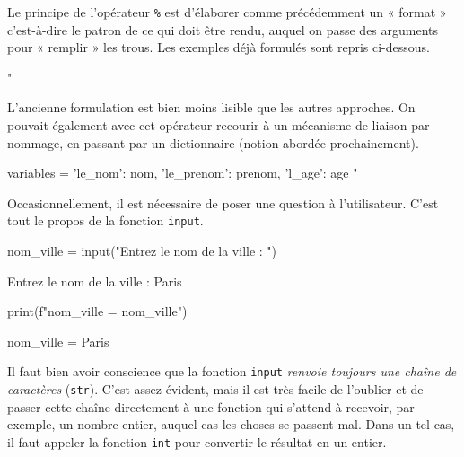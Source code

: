 Le principe de l'opérateur \texttt{\%} est d'élaborer comme précédemment un « format » c'est-à-dire le patron de ce qui doit être rendu, auquel on passe des arguments pour « remplir » les trous. Les exemples déjà formulés sont repris ci-dessous.

\begin{idleconsole}
	\begin{pyconsole}
		"%
	\end{pyconsole}
\end{idleconsole}

L'ancienne formulation est bien moins lisible que les autres approches. On pouvait également avec cet opérateur recourir à un mécanisme de liaison par nommage, en passant par un dictionnaire (notion abordée prochainement).

\begin{idleconsole}
	\begin{pyconsole}
		variables = {'le_nom': nom, 'le_prenom': prenom, 'l_age': age}
		"%
	\end{pyconsole}
\end{idleconsole}

\vspace{1pt}


Occasionnellement, il est nécessaire de poser une question à l'utilisateur. C'est tout le propos de la fonction \texttt{input}.

\begin{nbjupyterin}[before skip=4pt,after skip=1pt]{1}
nom_ville = input("Entrez le nom de la ville : ")
\end{nbjupyterin}
\begin{nbjupyterout}[after skip=4pt]{1}
Entrez le nom de la ville : Paris
\end{nbjupyterout}
\begin{nbjupyterin}[before skip=4pt,after skip=1pt]{2}
print(f"nom_ville = {nom_ville}")
\end{nbjupyterin}
\begin{nbjupyterout}[after skip=4pt]{2}
nom_ville = Paris
\end{nbjupyterout}

\begin{linewidthnote}
Il faut bien avoir conscience que la fonction \texttt{input} \emph{renvoie toujours une chaîne de caractères} (\texttt{str}). C'est assez évident, mais il est très facile de l'oublier et de passer cette chaîne directement à une fonction qui s'attend à recevoir, par exemple, un nombre entier, auquel cas les choses se passent mal. Dans un tel cas, il faut appeler la fonction \texttt{int} pour convertir le résultat en un entier.
\end{linewidthnote}

